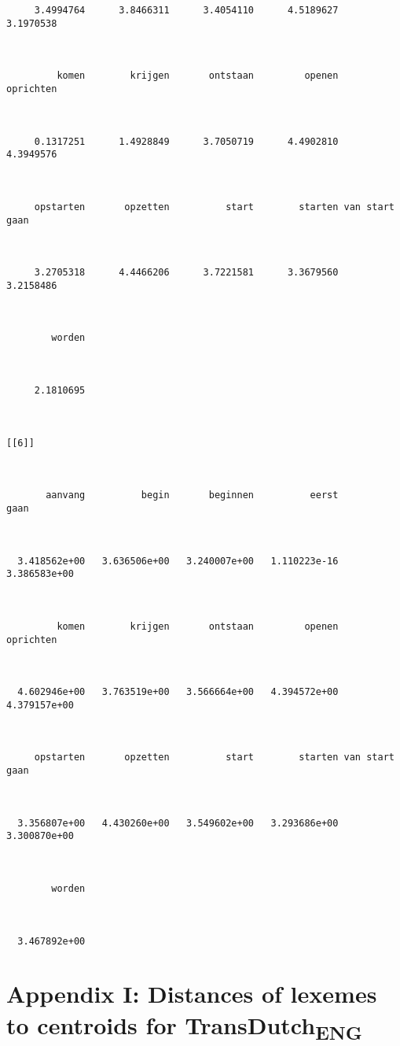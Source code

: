 \begin{lstlisting}
     3.4994764      3.8466311      3.4054110      4.5189627      3.1970538 



         komen        krijgen       ontstaan         openen      oprichten 



     0.1317251      1.4928849      3.7050719      4.4902810      4.3949576 



     opstarten       opzetten          start        starten van start gaan 



     3.2705318      4.4466206      3.7221581      3.3679560      3.2158486 



        worden 



     2.1810695 



[[6]]



       aanvang          begin       beginnen          eerst           gaan 



  3.418562e+00   3.636506e+00   3.240007e+00   1.110223e-16   3.386583e+00 



         komen        krijgen       ontstaan         openen      oprichten 



  4.602946e+00   3.763519e+00   3.566664e+00   4.394572e+00   4.379157e+00 



     opstarten       opzetten          start        starten van start gaan 



  3.356807e+00   4.430260e+00   3.549602e+00   3.293686e+00   3.300870e+00 



        worden 



  3.467892e+00 
\end{lstlisting}


\section*{Appendix I: Distances of lexemes to centroids for TransDutch\textsubscript{ENG}}

